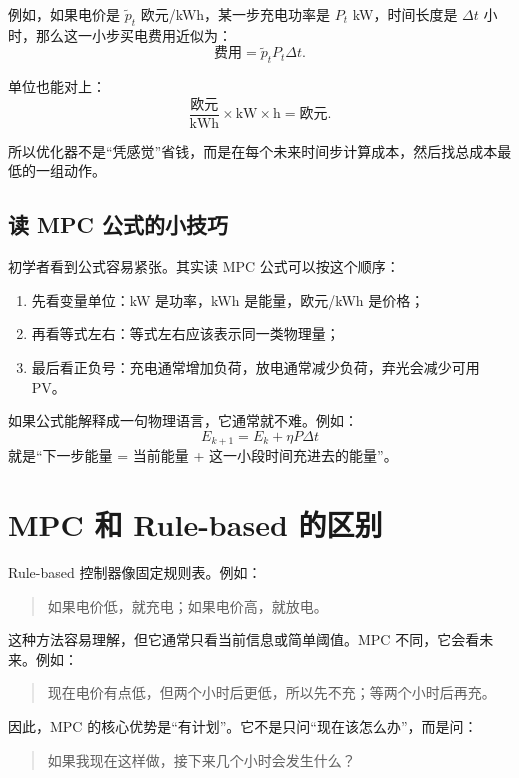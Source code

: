 \documentclass[UTF8,zihao=-4]{ctexart}
\begin{document}
例如，如果电价是 $\tilde p_t$ 欧元/kWh，某一步充电功率是 $P_t$ kW，时间长度是 $\Delta t$ 小时，那么这一小步买电费用近似为：
\begin{equation}
\text{费用}=\tilde p_t P_t\Delta t.
\end{equation}

单位也能对上：
\begin{equation}
\frac{\text{欧元}}{\text{kWh}}\times \text{kW}\times \text{h}
=\text{欧元}.
\end{equation}

所以优化器不是“凭感觉”省钱，而是在每个未来时间步计算成本，然后找总成本最低的一组动作。

\subsection{读 MPC 公式的小技巧}

初学者看到公式容易紧张。其实读 MPC 公式可以按这个顺序：
\begin{enumerate}
  \item 先看变量单位：kW 是功率，kWh 是能量，欧元/kWh 是价格；
  \item 再看等式左右：等式左右应该表示同一类物理量；
  \item 最后看正负号：充电通常增加负荷，放电通常减少负荷，弃光会减少可用 PV。
\end{enumerate}

如果公式能解释成一句物理语言，它通常就不难。例如：
\begin{equation}
E_{k+1}=E_k+\eta P\Delta t
\end{equation}
就是“下一步能量 = 当前能量 + 这一小段时间充进去的能量”。

\section{MPC 和 Rule-based 的区别}

Rule-based 控制器像固定规则表。例如：
\begin{quote}
如果电价低，就充电；如果电价高，就放电。
\end{quote}

这种方法容易理解，但它通常只看当前信息或简单阈值。MPC 不同，它会看未来。例如：
\begin{quote}
现在电价有点低，但两个小时后更低，所以先不充；等两个小时后再充。
\end{quote}

因此，MPC 的核心优势是“有计划”。它不是只问“现在该怎么办”，而是问：
\begin{quote}
如果我现在这样做，接下来几个小时会发生什么？
\end{quote}
\end{document}
